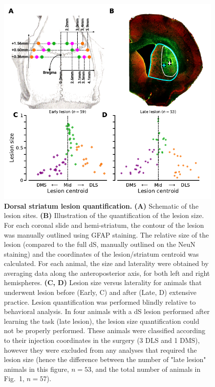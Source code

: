 \begin{figure}[bth!]
	\begin{center}
	   \includegraphics[scale=1]{ch-methods/figures/LesionSizeLocation.pdf}
	   \caption
	   {\textbf{Dorsal striatum lesion quantification.}
	   \textbf{(A)} Schematic of the lesion sites.
	   \textbf{(B)} Illustration of the quantification of the lesion size. For each coronal slide and hemi-striatum, the contour of the lesion was manually outlined using GFAP staining.
	   The relative size of the lesion (compared to the full dS, manually outlined on the NeuN staining) and the coordinates of the lesion/striatum centroid was calculated.
	   For each animal, the size and laterality were obtained by averaging data along the anteroposterior axis, for both left and right hemispheres.
	   \textbf{(C, D)} Lesion size versus laterality for animals that underwent lesion before (Early, C) and after (Late, D) extensive practice.
	   Lesion quantification was performed blindly relative to behavioral analysis.
   In four animals with a dS lesion performed after learning the task (late lesion), the lesion size quantification could not be properly performed.
	   These animals were classified according to their injection coordinates in the surgery (3 DLS and 1 DMS), however they were excluded from any analyses that required the lesion size (hence the difference between the number of "late lesion" animals in this figure, $n=53$, and the total number of animals in Fig.~1, $n=57$).
	   }
	   \label{fig:method:LesionSizeLocation}
	\end{center}
   \end{figure}